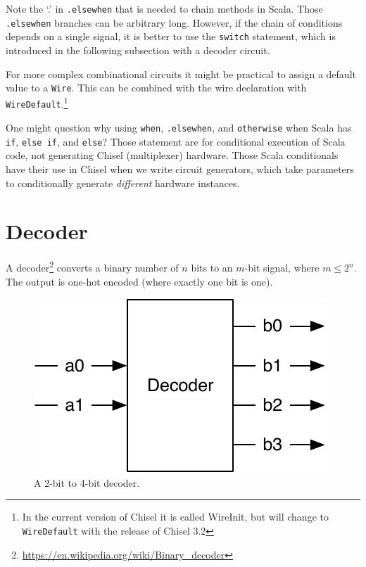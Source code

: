 \documentclass[%
    10pt,
    headinclude, footexclude,
    openright, %
    notitlepage,
    cleardoubleempty,
    headsepline,
    pointlessnumbers,
    bibtotoc, idxtotoc,
    ]{scrbook}
\newcommand{\code}[1]{{\small{\texttt{#1}}}}
\newcommand{\scale}{0.7}
\newcommand{\myref}[2]{\href{#1}{#2}}
\renewcommand{\myref}[2]{{#2}{\footnote{\url{#1}}}}
\begin{document}
Note the `.' in \code{.elsewhen} that is needed to chain methods in Scala.
Those \code{.elsewhen} branches can be arbitrary long.
However, if the chain of conditions depends on a single signal, it is better
to use the \code{switch} statement, which is introduced in the following
subsection with a decoder circuit.

For more complex combinational circuits it might be practical to assign
a default value to a \code{Wire}. This can be combined with the wire
declaration with \code{WireDefault}.\footnote{In the current version of Chisel
it is called WireInit, but will change to \code{WireDefault} with the release of Chisel 3.2}



One might question why using \code{when}, \code{.elsewhen}, and \code{otherwise}
when Scala has \code{if}, \code{else if}, and \code{else}? Those statement are for
conditional execution of Scala code, not generating Chisel (multiplexer) hardware.
Those Scala conditionals have their use in Chisel when we write circuit generators,
which take parameters to conditionally generate \emph{different} hardware instances.

\section{Decoder}

A \myref{https://en.wikipedia.org/wiki/Binary_decoder}{decoder}
converts a binary number of $n$ bits to an $m$-bit signal, where $m \leq 2^n$.
The output is one-hot encoded (where exactly one bit is one).

\begin{figure}
  \centering
  \includegraphics[scale=\scale]{figures/decoder}
  \caption{A 2-bit to 4-bit decoder.}
  \label{fig:decoder}
\end{figure}
\end{document}
